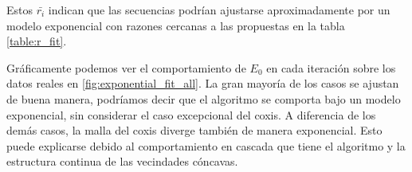 \begin{itemize}
    Estos $\bar{r_i}$ indican que las secuencias podrían ajustarse aproximadamente por un modelo exponencial con razones cercanas a las propuestas en la tabla \ref{table:r_fit}.

    Gráficamente podemos ver el comportamiento de $E_0$ en cada iteración sobre los datos reales en \autoref{fig:exponential_fit_all}.  La gran mayoría de los casos se ajustan de buena manera, podríamos decir que el algoritmo se comporta bajo un modelo exponencial, sin considerar el caso excepcional del coxis.  A diferencia de los demás casos, la malla del coxis diverge también de manera exponencial.  Esto puede explicarse debido al comportamiento en cascada que tiene el algoritmo y la estructura continua de las vecindades cóncavas.
    
%		



\end{itemize}
